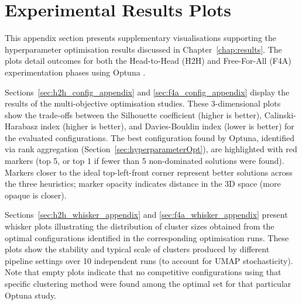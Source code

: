 \documentclass[10pt,oneside]{report}
\begin{document}

\section{Experimental Results Plots}\label{app:exp_results_plots}

This appendix section presents supplementary visualisations supporting the hyperparameter optimisation results discussed in Chapter~\ref{chap:results}. The plots detail outcomes for both the Head-to-Head (H2H) and Free-For-All (F4A) experimentation phases using Optuna \cite{akiba2019optuna}.

Sections~\ref{sec:h2h_config_appendix} and \ref{sec:f4a_config_appendix} display the results of the multi-objective optimisation studies. These 3-dimensional plots show the trade-offs between the Silhouette coefficient (higher is better), Calinski-Harabasz index (higher is better), and Davies-Bouldin index (lower is better) for the evaluated configurations. The best configuration found by Optuna, identified via rank aggregation (Section~\ref{sec:hyperparameterOpt}), are highlighted with red markers (top 5, or top 1 if fewer than 5 non-dominated solutions were found). Markers closer to the ideal top-left-front corner represent better solutions across the three heuristics; marker opacity indicates distance in the 3D space (more opaque is closer).

Sections~\ref{sec:h2h_whisker_appendix} and \ref{sec:f4a_whisker_appendix} present whisker plots illustrating the distribution of cluster sizes obtained from the optimal configurations identified in the corresponding optimisation runs. These plots show the stability and typical scale of clusters produced by different pipeline settings over 10 independent runs (to account for UMAP stochasticity). Note that empty plots indicate that no competitive configurations using that specific clustering method were found among the optimal set for that particular Optuna study.
\end{document}

